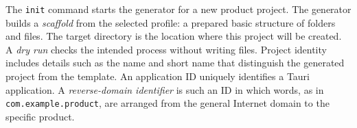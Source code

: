 \begin{beginnerstatement}

The \texttt{init} command starts the generator for a new product project. The
generator builds a \emph{scaffold} from the selected profile: a prepared basic
structure of folders and files. The target directory is the location where
this project will be created. A \emph{dry run} checks the intended process
without writing files. Project identity includes details such as the name and
short name that distinguish the generated project from the template. An
application ID uniquely identifies a Tauri application. A
\emph{reverse-domain identifier} is such an ID in which words, as in
\texttt{com.example.product}, are arranged from the general Internet domain
to the specific product.

\end{beginnerstatement}
